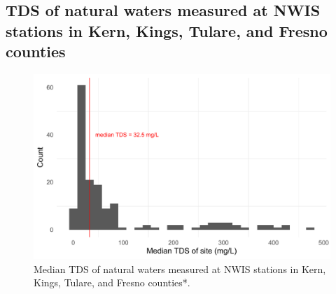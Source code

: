 \egroup
\clearpage


\subsection{TDS of natural waters measured at NWIS stations in Kern, Kings, Tulare, and Fresno counties}


\bgroup

\begin{figure}[H]
	\includegraphics[width=\textwidth]{ch3_appendix_figs/natural_waters.pdf}
	\caption{Median TDS of natural waters measured at NWIS stations in Kern, Kings, Tulare, and Fresno counties*.}
	\label{ap_b_nat_waters}
\end{figure}

\egroup


